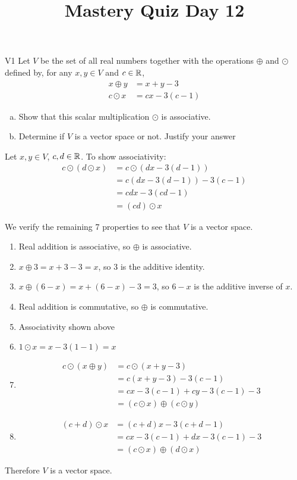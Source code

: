 \documentclass{sbgLAquiz}
\title{Mastery Quiz Day 12 }
\begin{document}
\begin{problem}{V1}
Let $V$ be the  set of all real numbers together with the operations $\oplus$ and $\odot$ defined by, for any $x,y \in V$ and $c \in \mathbb{R}$,
\begin{align*}
x\oplus y  &= x+y-3 \\
c \odot x &= cx-3(c-1)
\end{align*}
\begin{enumerate}[(a)]
\item Show that this scalar multiplication $\odot$ is associative.
\item Determine if $V$ is a vector space or not.  Justify your answer
\end{enumerate}
\end{problem}

\begin{solution}
Let $x,y \in V$, $c,d \in \mathbb{R}$.
To show associativity:
\begin{align*}
c\odot \left( d \odot x\right) &= c\odot \left( dx-3(d-1) \right) \\
&= c\left(dx-3(d-1)\right)-3(c-1) \\
&= cdx-3(cd-1) \\
&= (cd) \odot x
\end{align*}

We verify the remaining 7 properties to see that $V$ is a vector space.
\begin{enumerate}[1)]
\item Real addition is associative, so $\oplus$ is associative.
\item $x\oplus 3 = x+3-3=x$, so $3$ is the additive identity.
\item $x \oplus (6-x) = x+(6-x)-3=3$, so $6-x$ is the additive inverse of $x$.
\item Real addition is commutative, so $\oplus$ is commutative.
\item Associativity shown above
\item $1 \odot x = x-3(1-1)=x$
\item \begin{align*} c \odot (x \oplus y) &=
c \odot (x+y-3) \\
&= c(x+y-3)-3(c-1) \\
&= cx-3(c-1) + cy-3(c-1) -3 \\
&= (c\odot x ) \oplus (c\odot y)
\end{align*}
\item \begin{align*} (c+d) \odot x &= (c+d)x-3(c+d-1) \\
&= cx-3(c-1)+dx-3(c-1)-3 \\
&= (c\odot x ) \oplus (d \odot x)
\end{align*}
\end{enumerate}

Therefore $V$ is a vector space.
\end{solution}
\end{document}
